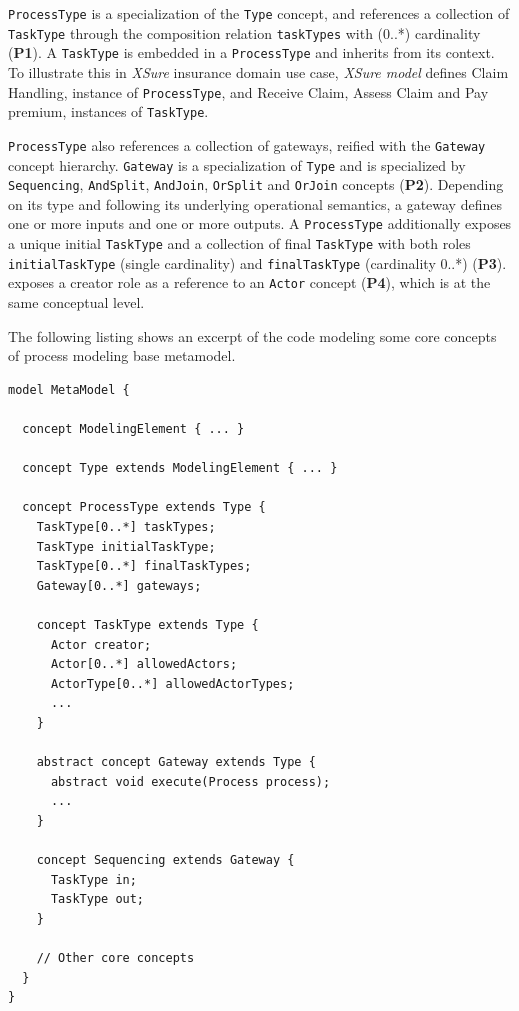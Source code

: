 \texttt{ProcessType} is a specialization of the \texttt{Type} concept, and references a collection of \texttt{TaskType} through the composition relation \texttt{taskTypes} with (0..*) cardinality (\textbf{P1}). A \texttt{TaskType} is embedded in a \texttt{ProcessType} and inherits from its context. To illustrate this in \textit{XSure} insurance domain use case, \textit{XSure model} defines \textsf{Claim Handling}, instance of \texttt{ProcessType}, and \textsf{Receive Claim}, \textsf{Assess Claim} and \textsf{Pay premium}, instances of \texttt{TaskType}.

\texttt{ProcessType} also references a collection of gateways, reified with the \texttt{Gateway} concept hierarchy. \texttt{Gateway} is a specialization of \texttt{Type} and is specialized by \texttt{Sequencing}, \texttt{AndSplit}, \texttt{AndJoin}, \texttt{OrSplit} and \texttt{OrJoin} concepts (\textbf{P2}). Depending on its type and following its underlying operational semantics, a gateway defines one or more inputs and one or more outputs. A \texttt{ProcessType} additionally exposes a unique initial \texttt{TaskType} and a collection of final \texttt{TaskType} with both roles \texttt{initialTaskType} (single cardinality) and \texttt{finalTaskType} (cardinality 0..*) (\textbf{P3}).  exposes a creator role as a reference to an \texttt{Actor} concept (\textbf{P4}), which is at the same conceptual level. 

The following listing shows an excerpt of the \FML code modeling some core concepts of process modeling base metamodel. 

\begin{lstlisting}
model MetaModel {

  concept ModelingElement { ... }
  
  concept Type extends ModelingElement { ... }
  
  concept ProcessType extends Type {
    TaskType[0..*] taskTypes;
    TaskType initialTaskType;
    TaskType[0..*] finalTaskTypes;
    Gateway[0..*] gateways;
        
    concept TaskType extends Type {
      Actor creator;
      Actor[0..*] allowedActors;
      ActorType[0..*] allowedActorTypes;
      ...
    }
        
    abstract concept Gateway extends Type {
      abstract void execute(Process process);
      ...
    }
        
    concept Sequencing extends Gateway {
      TaskType in;
      TaskType out;
    }
    
    // Other core concepts
  }
}    
\end{lstlisting}


